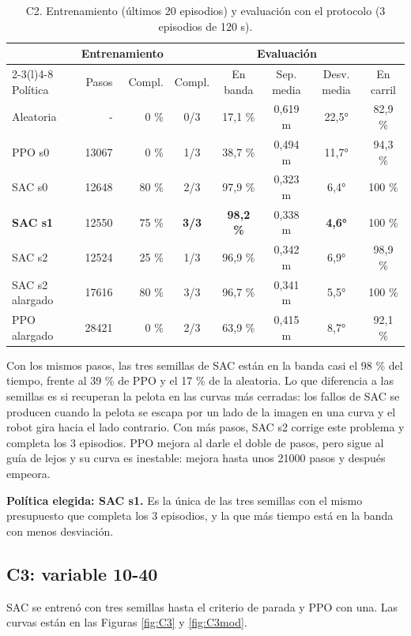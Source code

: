 \documentclass[11pt,a4paper]{article}
\begin{document}
\begin{table}[h]
\centering\small
\caption{C2. Entrenamiento (últimos 20 episodios) y evaluación con el protocolo (3 episodios de 120 s).}
\label{tab:C2}
\setlength{\tabcolsep}{3.5pt}
\begin{tabular}{@{}lrrccccc@{}}
\toprule
& \multicolumn{2}{c}{Entrenamiento} & \multicolumn{5}{c}{Evaluación} \\
\cmidrule(lr){2-3}\cmidrule(l){4-8}
Política & Pasos & Compl. & Compl. & En banda & Sep. media & Desv. media & En carril \\
\midrule
Aleatoria & - & 0 \% & 0/3 & 17,1 \% & 0,619 m & 22,5° & 82,9 \% \\
PPO s0 & 13067 & 0 \% & 1/3 & 38,7 \% & 0,494 m & 11,7° & 94,3 \% \\
SAC s0 & 12648 & 80 \% & 2/3 & 97,9 \% & 0,323 m & 6,4° & 100 \% \\
\textbf{SAC s1} & 12550 & 75 \% & \textbf{3/3} & \textbf{98,2 \%} & 0,338 m & \textbf{4,6°} & 100 \% \\
SAC s2 & 12524 & 25 \% & 1/3 & 96,9 \% & 0,342 m & 6,9° & 98,9 \% \\
\midrule
SAC s2 alargado & 17616 & 80 \% & 3/3 & 96,7 \% & 0,341 m & 5,5° & 100 \% \\
PPO alargado & 28421 & 0 \% & 2/3 & 63,9 \% & 0,415 m & 8,7° & 92,1 \% \\
\bottomrule
\end{tabular}
\end{table}

Con los mismos pasos, las tres semillas de SAC están en la banda casi el 98 \% del tiempo, frente al 39 \% de PPO
y el 17 \% de la aleatoria. Lo que diferencia a las semillas es si recuperan la pelota en las curvas más cerradas:
los fallos de SAC se producen cuando la pelota se escapa por un lado de la imagen en una curva y el robot gira
hacia el lado contrario. Con más pasos, SAC s2 corrige este problema y completa los 3 episodios. PPO mejora al
darle el doble de pasos, pero sigue al guía de lejos y su curva es inestable: mejora hasta unos 21000 pasos y
después empeora.

\textbf{Política elegida: SAC s1.} Es la única de las tres semillas con el mismo presupuesto que completa los 3
episodios, y la que más tiempo está en la banda con menos desviación.

\subsection{C3: variable 10-40}
SAC se entrenó con tres semillas hasta el criterio de parada y PPO con una. Las curvas están en las Figuras
\ref{fig:C3} y \ref{fig:C3mod}.
\end{document}
